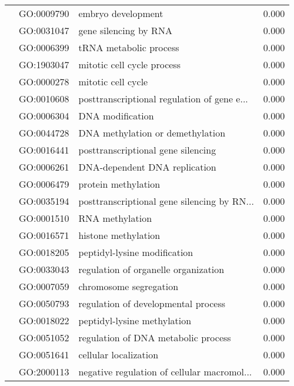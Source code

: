 \begin{longtable}{lllr}
   & GO:0009790 &                           embryo development &         0.000 \\
   & GO:0031047 &                        gene silencing by RNA &         0.000 \\
   & GO:0006399 &                       tRNA metabolic process &         0.000 \\
   & GO:1903047 &                   mitotic cell cycle process &         0.000 \\
   & GO:0000278 &                           mitotic cell cycle &         0.000 \\
   & GO:0010608 &  posttranscriptional regulation of gene e... &         0.000 \\
   & GO:0006304 &                             DNA modification &         0.000 \\
   & GO:0044728 &             DNA methylation or demethylation &         0.000 \\
   & GO:0016441 &           posttranscriptional gene silencing &         0.000 \\
   & GO:0006261 &                DNA-dependent DNA replication &         0.000 \\
   & GO:0006479 &                          protein methylation &         0.000 \\
   & GO:0035194 &  posttranscriptional gene silencing by RN... &         0.000 \\
   & GO:0001510 &                              RNA methylation &         0.000 \\
   & GO:0016571 &                          histone methylation &         0.000 \\
   & GO:0018205 &                 peptidyl-lysine modification &         0.000 \\
   & GO:0033043 &         regulation of organelle organization &         0.000 \\
   & GO:0007059 &                       chromosome segregation &         0.000 \\
   & GO:0050793 &          regulation of developmental process &         0.000 \\
   & GO:0018022 &                  peptidyl-lysine methylation &         0.000 \\
   & GO:0051052 &          regulation of DNA metabolic process &         0.000 \\
   & GO:0051641 &                        cellular localization &         0.000 \\
   & GO:2000113 &  negative regulation of cellular macromol... &         0.000 \\

\end{longtable}
